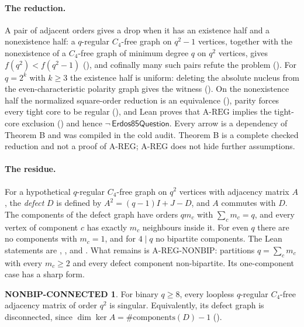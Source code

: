 \documentclass{anvil-paper}
\newcommand{\AREG}{\mathrm{A\text{-}REG}}
\newcommand{\NONBIP}{\mathrm{A\text{-}REG\text{-}NONBIP}}
\newcommand{\Qn}{\textsf{Erdos85Question}}
\theoremstyle{definition}
\newtheorem*{nonbipconn}{NONBIP-CONNECTED}
\begin{document}
\paragraph{The reduction.} A pair of adjacent orders gives a drop when it has an existence half and a nonexistence half: a $q$-regular $C_4$-free graph on $q^2-1$ vertices, together with the nonexistence of a $C_4$-free graph of minimum degree $q$ on $q^2$ vertices, gives $f(q^2)<f(q^2-1)$ (), and cofinally many such pairs refute the problem (). For $q=2^k$ with $k\ge 3$ the existence half is uniform: deleting the absolute nucleus from the even-characteristic polarity graph gives the witness (). On the nonexistence half the normalized square-order reduction is an equivalence (), parity forces every tight core to be regular (), and Lean proves that $\AREG$ implies the tight-core exclusion () and hence $\neg\,\Qn$. Every arrow is a dependency of Theorem B and was compiled in the cold audit. Theorem B is a complete checked reduction and not a proof of $\AREG$; $\AREG$ does not hide further assumptions.

\paragraph{The residue.} For a hypothetical $q$-regular $C_4$-free graph on $q^2$ vertices with adjacency matrix $A$, the \emph{defect} $D$ is defined by $A^2=(q-1)I+J-D$, and $A$ commutes with $D$. The components of the defect graph have orders $qm_c$ with $\sum_c m_c=q$, and every vertex of component $c$ has exactly $m_c$ neighbours inside it. For even $q$ there are no components with $m_c=1$, and for $4\mid q$ no bipartite components. The Lean statements are , ,  and . What remains is $\NONBIP$: partitions $q=\sum_c m_c$ with every $m_c\ge 2$ and every defect component non-bipartite. Its one-component case has a sharp form.

\begin{nonbipconn}
For binary $q\ge 8$, every loopless $q$-regular $C_4$-free adjacency matrix of order $q^2$ is singular. Equivalently, its defect graph is disconnected, since $\dim\ker A=\#\mathrm{components}(D)-1$ ().
\end{nonbipconn}
\end{document}
